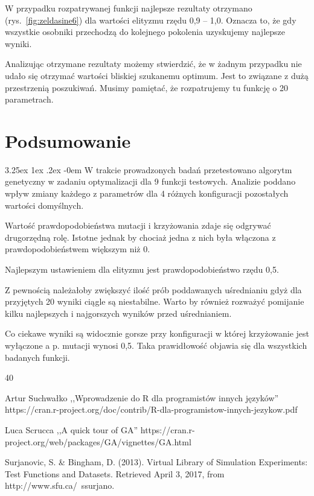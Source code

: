 \documentclass[11pt, a4paper]{article}
\makeatletter
\newcommand{\fbi}{\leavevmode{\parindent=1em\indent}}
\renewcommand\paragraph{\@startsection{paragraph}{5}{\z@}
  {3.25ex \@plus1ex \@minus.2ex}
  {-0em}
  {\normalfont\normalsize\bfseries}}
\makeatother
\begin{document}
\fbi
W przypadku rozpatrywanej funkcji najlepsze rezultaty otrzymano (rys.~\ref{fig:zeldasine6}) dla wartości elityzmu rzędu 0,9 -- 1,0. Oznacza to, że gdy wszystkie osobniki przechodzą do kolejnego pokolenia uzyskujemy najlepsze wyniki.

\fbi
Analizując otrzymane rezultaty możemy stwierdzić, że w żadnym przypadku nie udało się otrzymać wartości bliskiej szukanemu optimum. Jest to związane z dużą przestrzenią poszukiwań. Musimy pamiętać, że rozpatrujemy tu funkcję o 20 parametrach.

\newpage
\section{Podsumowanie}
\paragraph{}
W trakcie prowadzonych badań przetestowano algorytm genetyczny w zadaniu optymalizacji dla 9 funkcji testowych. Analizie poddano wpływ zmiany każdego z parametrów dla 4 różnych konfiguracji pozostałych wartości domyślnych.

\fbi
Wartość prawdopodobieństwa mutacji i krzyżowania zdaje się odgrywać drugorzędną rolę. Istotne jednak by chociaż jedna z nich była włączona z prawdopodobieństwem większym niż 0.

\fbi
Najlepszym ustawieniem dla elityzmu jest prawdopodobieństwo rzędu 0,5.

\fbi
Z pewnością należałoby zwiększyć ilość prób poddawanych uśrednianiu gdyż dla przyjętych 20 wyniki ciągle są niestabilne. Warto by również rozważyć pomijanie kilku najlepszych i najgorszych wyników przed uśrednianiem.

\fbi
Co ciekawe wyniki są widocznie gorsze przy konfiguracji w której krzyżowanie jest wyłączone a p. mutacji wynosi 0,5. Taka prawidłowość objawia się dla wszystkich badanych funkcji.

\newpage
\begin{thebibliography}{40}

Artur Suchwałko ,,Wprowadzenie do R dla programistów innych języków'' https://cran.r-project.org/doc/contrib/R-dla-programistow-innych-jezykow.pdf

Luca Scrucca ,,A quick tour of GA''
https://cran.r-project.org/web/packages/GA/vignettes/GA.html

Surjanovic, S. \& Bingham, D. (2013). Virtual Library of Simulation Experiments: Test Functions and Datasets. Retrieved April 3, 2017, from http://www.sfu.ca/~ssurjano.

\end{thebibliography}
\end{document}
